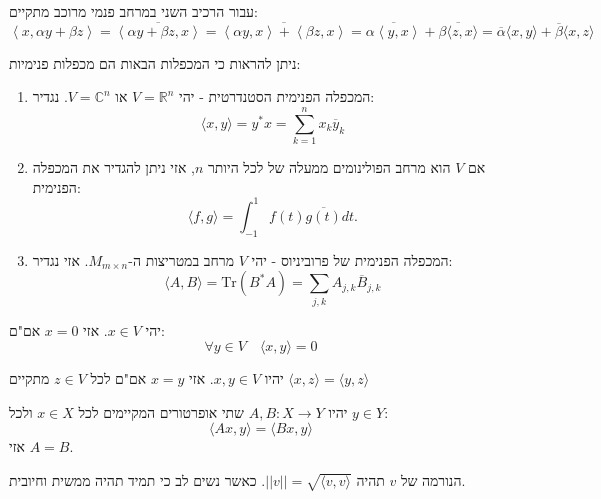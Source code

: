 \documentclass{tstextbook}
\begin{document}
\begin{corollary}
עבור הרכיב השני במרחב פנמי מרוכב מתקיים:
$$\left\langle  x,\alpha y+\beta z  \right\rangle =\overline{\left\langle  \alpha y+\beta z,x  \right\rangle } =\overline{\left\langle  \alpha y,x  \right\rangle +\left\langle  \beta z,x  \right\rangle } =\overline{\alpha\left\langle   y,x  \right\rangle }+\overline{\beta \langle z,x \rangle }  =\overline{\alpha} \langle x,y \rangle +\overline{\beta} \langle x,z \rangle $$

\end{corollary}
\begin{example}
ניתן להראות כי המכפלות הבאות הם מכפלות פנימיות:

  \begin{enumerate}
    \item המכפלה הפנימית הסטנדרטית - יהי \(V=\mathbb{R}^n\) או \(V=\mathbb{C}^{n}\). נגדיר: 
$$\langle x,y \rangle = y^{*}x=\sum_{k=1}^{n}x_{k}\overline{y} _{k}$$


    \item אם \(V\) הוא מרחב  הפולינומים ממעלה של לכל היותר \(n\), אזי ניתן להגדיר את המכפלה הפנימית: 
$$\langle f,g \rangle =\int_{-1}^{1}f(t){\overline{{g(t)}}}d t.$$


    \item המכפלה הפנימית של פרוביניוס - יהי \(V\) מרחב במטריצות ה-\(M_{m\times n}\). אזי נגדיר: 
$$\langle A,B \rangle =\mathrm{Tr}(B^{*}A)=\sum_{j,k} A_{j,k}\overline{B} _{j,k}$$


  \end{enumerate}
\end{example}
\begin{proposition}
יהי \(x \in V\). אזי \(x=0\) אם"ם:
$$\forall y \in V\quad \langle x,y \rangle=0 $$

\end{proposition}
\begin{corollary}
יהיו \(x,y \in V\). אזי \(x=y\) אם"ם לכל \(z \in V\) מתקיים \(\langle x,z \rangle=\langle y,z \rangle\)

\end{corollary}
\begin{corollary}
יהיו \(A,B:X\to Y\) שתי אופרטורים המקיימים לכל \(x \in X\) ולכל \(y \in Y\):
$$\langle Ax,y \rangle =\langle Bx,y \rangle $$
אזי \(A=B\).

\end{corollary}
\begin{definition}[נורמה]
הנורמה של \(v\) תהיה \(||v|| = \sqrt{\langle v, v \rangle}\). כאשר נשים לב כי תמיד תהיה ממשית וחיובית.

\end{definition}
\end{document}
